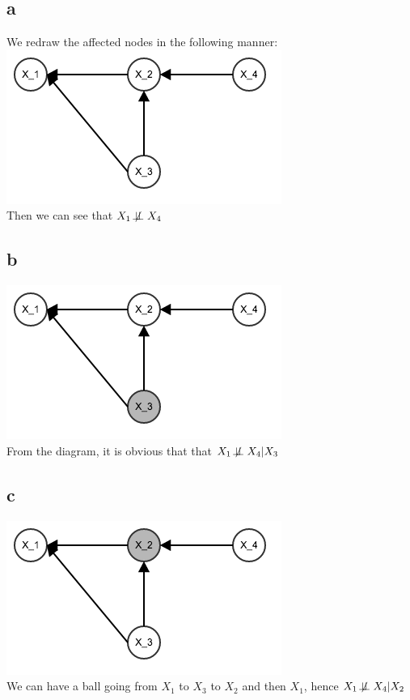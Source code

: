 \documentclass[twoside]{homework}
\begin{document}
\subsection*{a}
We redraw the affected nodes in the following manner:\\
\includegraphics[scale=0.5]{2a}\\
Then we can see that $X_1\not\!\perp\!\!\!\perp X_4$
\subsection*{b}
\includegraphics[scale=0.5]{2b}\\
From the diagram, it is obvious that that $X_1\not\!\perp\!\!\!\perp X_4 | X_3$
\subsection*{c}
\includegraphics[scale=0.5]{2c}\\
We can have a ball going from $X_1$ to $X_3$ to $X_2$ and then $X_1$, hence $X_1\not\!\perp\!\!\!\perp X_4 | X_2$
\end{document}
